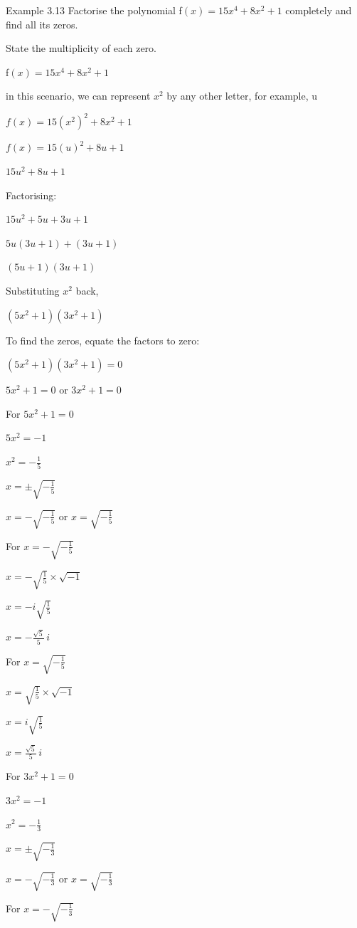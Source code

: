\begin{example}{Example 3.13}
Factorise the polynomial f$(x) = 15x^4 + 8x^2 + 1$ completely and find all its zeros.

State the multiplicity of each zero.

\solution
f$(x) = 15x^4 + 8x^2 + 1$

in this scenario, we can represent $x^2$ by any other letter, for example, u

$f(x) = 15(x^2)^2 + 8x^2 + 1$

$f(x) = 15(u)^2 + 8u + 1$

$15u^2 + 8u + 1$

Factorising:

$15u^2 + 5u + 3u + 1$

$5u(3u + 1) + (3u + 1)$

$(5u + 1)(3u + 1)$

Substituting $x^2$ back,

$(5x^2 + 1)(3x^2 + 1)$

To find the zeros, equate the factors to zero:

$(5x^2 + 1)(3x^2 + 1) = 0$

$5x^2 + 1 = 0$ or $3x^2 + 1 = 0$

For $5x^2 + 1 = 0$

$5x^2 = -1$

$x^2 = -\frac{1}{5}$

$x = \pm\sqrt{-\frac{1}{5}}$

$x = -\sqrt{-\frac{1}{5}}$ or $x = \sqrt{-\frac{1}{5}}$

For $x = -\sqrt{-\frac{1}{5}}$

$x = -\sqrt{\frac{1}{5}} \times \sqrt{-1}$

$x = -i\sqrt{\frac{1}{5}}$

$x = -\frac{\sqrt{5}}{5}\,i$

For $x = \sqrt{-\frac{1}{5}}$

$x = \sqrt{\frac{1}{5}} \times \sqrt{-1}$

$x = i\sqrt{\frac{1}{5}}$

$x = \frac{\sqrt{5}}{5}\,i$

For $3x^2 + 1 = 0$

$3x^2 = -1$

$x^2 = -\frac{1}{3}$

$x = \pm\sqrt{-\frac{1}{3}}$

$x = -\sqrt{-\frac{1}{3}}$ or $x = \sqrt{-\frac{1}{3}}$

For $x = -\sqrt{-\frac{1}{3}}$


\end{example}
